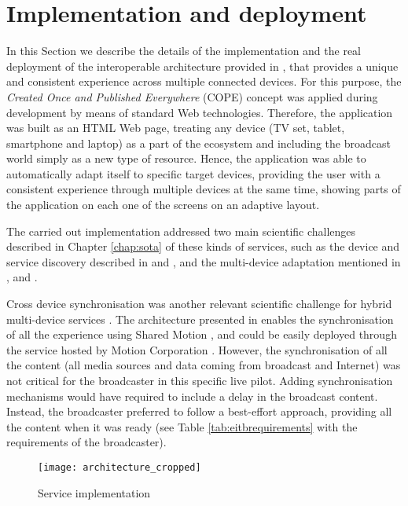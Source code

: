 \section{Implementation and deployment} \label{architecture}

In this Section we describe the details of the implementation and the real deployment of the interoperable architecture provided in \cite{Zorrilla2015}, that provides a unique and consistent experience across multiple connected devices. For this purpose, the \textit{Created Once and Published Everywhere} (COPE) concept was applied during development by means of standard Web technologies. Therefore, the application was built as an HTML Web page, treating any device (TV set, tablet, smartphone and laptop) as a part of the ecosystem and including the broadcast world simply as a new type of resource. Hence, the application was able to automatically adapt itself to specific target devices, providing the user with a consistent experience through multiple devices at the same time, showing parts of the application on each one of the screens on an adaptive layout.  

The carried out implementation addressed two main scientific challenges described in Chapter \ref{chap:sota} of these kinds of services, such as the device and service discovery described in \cite{zorrilla14bmsb} and \cite{ziegler2013}, and the multi-device adaptation mentioned in \cite{Zorrilla2015}, \cite{zorrilla15bmsb} and \cite{paterno2012}.

Cross device synchronisation was another relevant scientific challenge for hybrid multi-device services \cite{zorrilla2013} \cite{deventer}. The architecture presented in \cite{Zorrilla2015} enables the synchronisation of all the experience using Shared Motion \cite{motion}, and could be easily deployed through the service hosted by Motion Corporation \cite{motioncorp}. However, the synchronisation of all the content (all media sources and data coming from broadcast and Internet) was not critical for the broadcaster in this specific live pilot. Adding synchronisation mechanisms would have required to include a delay in the broadcast content. Instead, the broadcaster preferred to follow a best-effort approach, providing all the content when it was ready (see Table \ref{tab:eitbrequirements} with the requirements of the broadcaster).    

\begin{figure}
	\centering
	\texttt{[image: architecture\_cropped]}
	\caption{Service implementation}
	\label{fig:appArch}
\end{figure}

